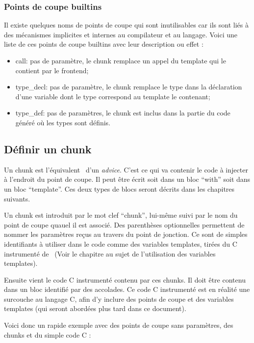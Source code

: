 \documentclass[french]{rtxreport}
\begin{document}
\subsubsection{Points de coupe builtins}

Il existe quelques noms de points de coupe qui sont inutilisables car ils sont
liés à des mécanismes implicites et internes au compilateur et au langage.
Voici une liste de ces points de coupe builtins avec leur description ou effet
:
\begin{itemize}
    \item call: pas de paramètre, le chunk remplace un appel du template qui le
        contient par le frontend;
    \item type\_decl: pas de paramètre, le chunk remplace le type dans la
        déclaration d'une variable dont le type correspond au template le
        contenant;
    \item type\_def: pas de paramètres, le chunk est inclus dans la partie du
        code généré où les types sont définis.
\end{itemize}


\subsection{Définir un chunk}

Un chunk est l'équivalent \rtx\ d'un \emph{advice}. C'est ce qui va contenir le
code à injecter à l'endroit du point de coupe. Il peut être écrit soit dans un
bloc ``with'' soit dans un bloc ``template''. Ces deux types de blocs seront
décrits dans les chapitres suivants.


Un chunk est introduit par le mot clef ``chunk'', lui-même suivi par le nom du
point de coupe quauel il est associé. Des parenthèses optionnelles permettent
de nommer les paramètres reçus au travers du point de jonction. Ce sont de
simples identifiants à utiliser dans le code comme des variables templates,
tirées du C instrumenté de \rtx\ (Voir le chapitre au sujet de l'utilisation
des variables templates).

Ensuite vient le code C instrumenté contenu par ces chunks. Il doit être
contenu dans un bloc identifié par des accolades. Ce code C instrumenté est en
réalité une surcouche au langage C, afin d'y inclure des points de coupe et des
variables templates (qui seront abordées plus tard dans ce document).

Voici donc un rapide exemple avec des points de coupe sans paramètres, des
chunks et du simple code C :
\end{document}
